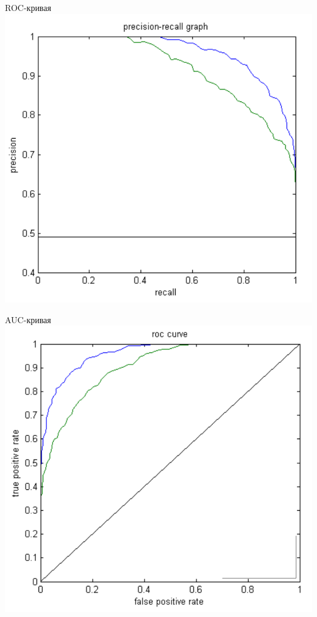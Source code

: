 \documentclass[10pt]{beamer}
\begin{document}
{
\begin{frame}{ROC-кривая}
  \centering
  \includegraphics[height=0.7 \textheight, keepaspectratio = true]{images/roc}   \\
\end{frame}
}

{
\begin{frame}{AUC-кривая}
  \centering
  \includegraphics[height=0.7 \textheight, keepaspectratio = true]{images/auc}   \\  
\end{frame}
}
\end{document}
